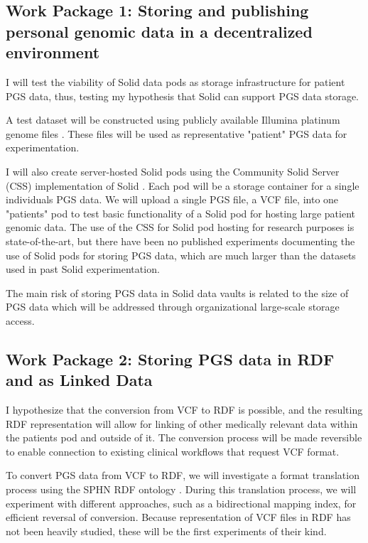 \documentclass[runningheads]{llncs}
\begin{document}
\subsection{Work Package 1: Storing and publishing personal genomic data in a decentralized environment} 

I will test the viability of Solid data pods as storage infrastructure for patient PGS data, thus, testing my hypothesis that Solid can support PGS data storage. 

A test dataset will be constructed using publicly available Illumina platinum genome files \cite{noauthor_platinum_nodate}. 
These files will be used as representative "patient" PGS data for experimentation. 

I will also create server-hosted Solid pods using the Community Solid Server (CSS) implementation of Solid \cite{css}. 
Each pod will be a storage container for a single individual\textquotesingle s PGS data. 
We will upload a single PGS file, a VCF file, into one "patient\textquotesingle s" pod to test basic functionality of a Solid pod for hosting large patient genomic data. 
The use of the CSS for Solid pod hosting for research purposes is state-of-the-art, but there have been no published experiments documenting the use of Solid pods for storing PGS data, which are much larger than the datasets used in past Solid experimentation. 

The main risk of storing PGS data in Solid data vaults is related to the size of PGS data which will be addressed through organizational large-scale storage access. 


\subsection{Work Package 2:  Storing PGS data in RDF and as Linked Data}

I hypothesize that the conversion from VCF to RDF is possible, and the resulting RDF representation will allow for linking of other medically relevant data within the patient\textquotesingle s pod and outside of it.
The conversion process will be made reversible to enable connection to existing clinical workflows that request VCF format. 

To convert PGS data from VCF to RDF, we will investigate a format translation process using the SPHN RDF ontology \cite{van_der_horst_bridging_2023}. 
During this translation process, we will experiment with different approaches, such as a bidirectional mapping index, for efficient reversal of conversion.
Because representation of VCF files in RDF has not been heavily studied, these will be the first experiments of their kind.
\end{document}
